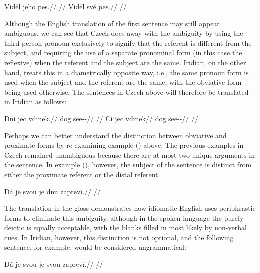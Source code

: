 \begin{multicols}{2}
  \pex
  \a
  \begingl
  \gla Viděl jeho pes.//
  \glft {}//
  \endgl
  \a \begingl
  \gla Viděl své pes.//
  \glft {}//
  \endgl
  \xe
\end{multicols}

Although the English translation of the first sentence may still appear ambiguous, we can see that Czech does away with the ambiguity by using the third person pronoun  exclusively to signify that the referent is different from the subject, and requiring the use of a separate pronominal form (in this case the reflexive) when the referent and the subject are the same. Iridian, on the other hand, treats this in a diametrically opposite way, i.e., the same pronoun form is used when the subject and the referent are the same, with the obviative form being used otherwise. The sentences in Czech above will therefore be translated in Iridian as follows:

\pex
\a
\begingl
\gla Dní jec vdinek.//
\glb {} dog see-\Pv{}-\Pf{}//
\glft {}//
\endgl
\a \begingl
\gla Ci jec vdinek//
\glb {} dog see-\Pv{}-\Pf{}//
\glft {}//
\endgl
\xe

Perhaps we can better understand the distinction between obviative and proximate forms by re-examining example () above. The previous examples in Czech remained unambiguous because there are at most two unique arguments in the sentence. In example (), however, the subject of the sentence is distinct from either the proximate referent or the distal referent.

\ex[exno={\getfullref{obv.obv1}}]
\begingl
\gla Dá je svou je dnu zapreví.//
\glft {}//
\endgl
\xe

The translation in the gloss demonstrates how idiomatic English uses periphrastic forms to eliminate this ambiguity, although in the spoken language the purely deictic  is equally acceptable, with the blanks filled in most likely by non-verbal cues. In Iridian, however, this distinction is not optional, and the following sentence, for example, would be considered ungrammatical:

\ex
\begingl
\gla *Dá je svou je svou zapreví.//
\glft {}//
\endgl
\xe

